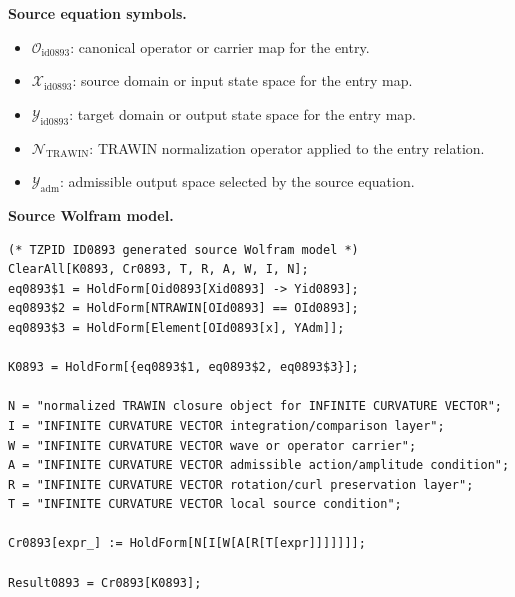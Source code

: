 \begin{minipage}[t]{0.49\linewidth}
\begingroup
\small
\raggedright
\textbf{Source equation symbols.}\par
\begin{itemize}[leftmargin=1.35em,itemsep=1pt,topsep=1pt,parsep=0pt]
    \item $\mathcal{O}_{\mathrm{id0893}}$: canonical operator or carrier map for the entry.
    \item $\mathcal{X}_{\mathrm{id0893}}$: source domain or input state space for the entry map.
    \item $\mathcal{Y}_{\mathrm{id0893}}$: target domain or output state space for the entry map.
    \item $\mathcal{N}_{\mathrm{TRAWIN}}$: TRAWIN normalization operator applied to the entry relation.
    \item $\mathcal{Y}_{\mathrm{adm}}$: admissible output space selected by the source equation.
\end{itemize}
\endgroup
\end{minipage}\hfill
\begin{minipage}[t]{0.47\linewidth}
\begingroup
\scriptsize
\raggedright
\textbf{Source Wolfram model.}\par
\begin{Verbatim}[fontsize=\tiny,breaklines=true,breakanywhere=true]
(* TZPID ID0893 generated source Wolfram model *)
ClearAll[K0893, Cr0893, T, R, A, W, I, N];
eq0893$1 = HoldForm[Oid0893[Xid0893] -> Yid0893];
eq0893$2 = HoldForm[NTRAWIN[OId0893] == OId0893];
eq0893$3 = HoldForm[Element[OId0893[x], YAdm]];

K0893 = HoldForm[{eq0893$1, eq0893$2, eq0893$3}];

N = "normalized TRAWIN closure object for INFINITE CURVATURE VECTOR";
I = "INFINITE CURVATURE VECTOR integration/comparison layer";
W = "INFINITE CURVATURE VECTOR wave or operator carrier";
A = "INFINITE CURVATURE VECTOR admissible action/amplitude condition";
R = "INFINITE CURVATURE VECTOR rotation/curl preservation layer";
T = "INFINITE CURVATURE VECTOR local source condition";

Cr0893[expr_] := HoldForm[N[I[W[A[R[T[expr]]]]]]];

Result0893 = Cr0893[K0893];
\end{Verbatim}
\endgroup
\end{minipage}


